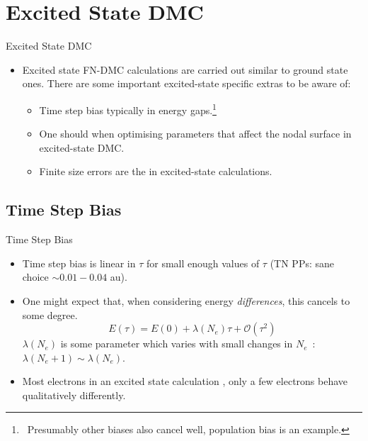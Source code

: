 \documentclass[12pt, pdf, hyperref={draft}, usenames, dvipsnames,
aspectratio=169]{beamer}
\newcommand{\blue}[1]{{\bf\color{NavyBlue}{#1}}}
\newcommand{\green}[1]{{\bf\color{ForestGreen}{#1}}}
\begin{document}

\section{Excited State DMC}\label{sec:excited_state_dmc}


\begin{frame}{Excited State DMC}
\begin{itemize}
  \item Excited state FN-DMC calculations are carried out similar to ground
  state ones. There are some important excited-state specific extras to be
  aware of:
    \begin{itemize}

      \item Time step bias typically \green{cancels quite well}
      in energy gaps.\footnote{\ Presumably other biases also cancel well,
      population bias is an example.}

      \item One should \blue{be careful} when optimising
      parameters that affect the nodal surface in excited-state DMC\@.

      \item Finite size errors are the \blue{dominant source of error} in
      excited-state calculations.

    \end{itemize}
\end{itemize}
\end{frame}


\subsection{Time Step Bias}\label{sub:time_step_bias}

\begin{frame}{Time Step Bias}
\begin{itemize}
  \item Time step bias is linear in $\tau$ for small enough values of $\tau$
  (TN PPs: sane choice $\sim 0.01-0.04$ au).

  \item One might expect that, when considering energy \textit{differences},
  this cancels to some degree.
  \begin{equation}
    E(\tau) = E(0) + \lambda(N_e)\tau + \mathcal{O}(\tau^2)
  \end{equation}
  $\lambda(N_e)$ is some parameter which varies \green{slowly} with small
  changes in $N_e$~: $\lambda(N_e+1)\sim\lambda(N_e)$.

  \item Most electrons in an excited state calculation \green{continue to
  behave as they previously did}, only a few electrons behave qualitatively
  differently.
\end{itemize}
\end{frame}
\end{document}
